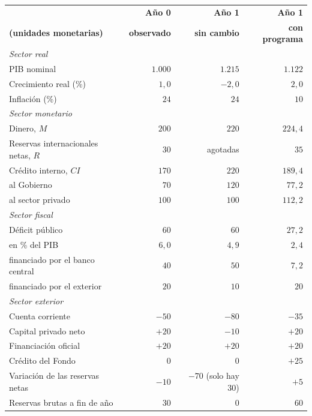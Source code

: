 \documentclass[10pt,a4paper]{article}
\begin{document}
\begin{center}
{\footnotesize
\begin{tabular}{|p{6.3cm}|r|r|r|}
\hline
\textbf{} & \textbf{Año 0} & \textbf{Año 1} & \textbf{Año 1} \\
\textbf{(unidades monetarias)} & \textbf{observado} & \textbf{sin cambio} & \textbf{con programa} \\
\hline
\multicolumn{4}{|l|}{\textit{Sector real}} \\
\hline
PIB nominal & $1{.}000$ & $1{.}215$ & $1{.}122$ \\
\hline
Crecimiento real (\%) & $1{,}0$ & $-2{,}0$ & $2{,}0$ \\
\hline
Inflación (\%) & $24$ & $24$ & $10$ \\
\hline
\multicolumn{4}{|l|}{\textit{Sector monetario}} \\
\hline
Dinero, $M$ & $200$ & $220$ & $224{,}4$ \\
\hline
Reservas internacionales netas, $R$ & $30$ & agotadas & $35$ \\
\hline
Crédito interno, $CI$ & $170$ & $220$ & $189{,}4$ \\
\hline
\quad al Gobierno & $70$ & $120$ & $77{,}2$ \\
\hline
\quad al sector privado & $100$ & $100$ & $112{,}2$ \\
\hline
\multicolumn{4}{|l|}{\textit{Sector fiscal}} \\
\hline
Déficit público & $60$ & $60$ & $27{,}2$ \\
\hline
\quad en \% del PIB & $6{,}0$ & $4{,}9$ & $2{,}4$ \\
\hline
\quad financiado por el banco central & $40$ & $50$ & $7{,}2$ \\
\hline
\quad financiado por el exterior & $20$ & $10$ & $20$ \\
\hline
\multicolumn{4}{|l|}{\textit{Sector exterior}} \\
\hline
Cuenta corriente & $-50$ & $-80$ & $-35$ \\
\hline
Capital privado neto & $+20$ & $-10$ & $+20$ \\
\hline
Financiación oficial & $+20$ & $+20$ & $+20$ \\
\hline
Crédito del Fondo & $0$ & $0$ & $+25$ \\
\hline
Variación de las reservas netas & $-10$ & $-70$ (solo hay $30$) & $+5$ \\
\hline
Reservas brutas a fin de año & $30$ & $0$ & $60$ \\
\hline
\end{tabular}}
\end{center}
\end{document}
